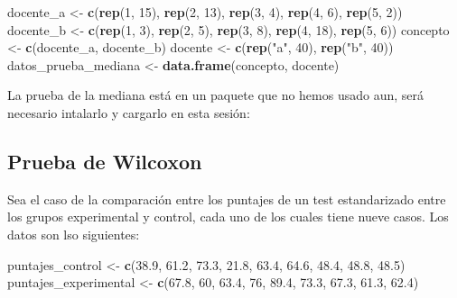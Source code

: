 \documentclass[]{book}
\newenvironment{Shaded}{\begin{snugshade}}{\end{snugshade}}
\newcommand{\DecValTok}[1]{\textcolor[rgb]{0.00,0.00,0.81}{#1}}
\newcommand{\FloatTok}[1]{\textcolor[rgb]{0.00,0.00,0.81}{#1}}
\newcommand{\KeywordTok}[1]{\textcolor[rgb]{0.13,0.29,0.53}{\textbf{#1}}}
\newcommand{\NormalTok}[1]{#1}
\newcommand{\StringTok}[1]{\textcolor[rgb]{0.31,0.60,0.02}{#1}}
\begin{document}
\begin{Shaded}
\begin{Highlighting}[]
\NormalTok{docente_a <-}\StringTok{ }\KeywordTok{c}\NormalTok{(}\KeywordTok{rep}\NormalTok{(}\DecValTok{1}\NormalTok{, }\DecValTok{15}\NormalTok{), }\KeywordTok{rep}\NormalTok{(}\DecValTok{2}\NormalTok{, }\DecValTok{13}\NormalTok{), }\KeywordTok{rep}\NormalTok{(}\DecValTok{3}\NormalTok{, }\DecValTok{4}\NormalTok{), }\KeywordTok{rep}\NormalTok{(}\DecValTok{4}\NormalTok{, }\DecValTok{6}\NormalTok{), }\KeywordTok{rep}\NormalTok{(}\DecValTok{5}\NormalTok{, }\DecValTok{2}\NormalTok{))}
\NormalTok{docente_b <-}\StringTok{ }\KeywordTok{c}\NormalTok{(}\KeywordTok{rep}\NormalTok{(}\DecValTok{1}\NormalTok{, }\DecValTok{3}\NormalTok{), }\KeywordTok{rep}\NormalTok{(}\DecValTok{2}\NormalTok{, }\DecValTok{5}\NormalTok{), }\KeywordTok{rep}\NormalTok{(}\DecValTok{3}\NormalTok{, }\DecValTok{8}\NormalTok{), }\KeywordTok{rep}\NormalTok{(}\DecValTok{4}\NormalTok{, }\DecValTok{18}\NormalTok{), }\KeywordTok{rep}\NormalTok{(}\DecValTok{5}\NormalTok{, }\DecValTok{6}\NormalTok{))}
\NormalTok{concepto <-}\StringTok{ }\KeywordTok{c}\NormalTok{(docente_a, docente_b)}
\NormalTok{docente <-}\StringTok{ }\KeywordTok{c}\NormalTok{(}\KeywordTok{rep}\NormalTok{(}\StringTok{"a"}\NormalTok{, }\DecValTok{40}\NormalTok{), }\KeywordTok{rep}\NormalTok{(}\StringTok{"b"}\NormalTok{, }\DecValTok{40}\NormalTok{))}
\NormalTok{datos_prueba_mediana <-}\StringTok{ }\KeywordTok{data.frame}\NormalTok{(concepto, docente)}
\end{Highlighting}
\end{Shaded}

La prueba de la mediana está en un paquete que no hemos usado aun, será necesario intalarlo y cargarlo en esta sesión:

\hypertarget{prueba-de-wilcoxon}{%
\subsection{Prueba de Wilcoxon}\label{prueba-de-wilcoxon}}

Sea el caso de la comparación entre los puntajes de un test estandarizado entre los grupos experimental y control, cada uno de los cuales tiene nueve casos. Los datos son lso siguientes:

\begin{Shaded}
\begin{Highlighting}[]
\NormalTok{puntajes_control <-}\StringTok{ }\KeywordTok{c}\NormalTok{(}\FloatTok{38.9}\NormalTok{, }\FloatTok{61.2}\NormalTok{, }\FloatTok{73.3}\NormalTok{, }\FloatTok{21.8}\NormalTok{, }\FloatTok{63.4}\NormalTok{, }\FloatTok{64.6}\NormalTok{, }\FloatTok{48.4}\NormalTok{, }\FloatTok{48.8}\NormalTok{, }\FloatTok{48.5}\NormalTok{)}
\NormalTok{puntajes_experimental <-}\StringTok{ }\KeywordTok{c}\NormalTok{(}\FloatTok{67.8}\NormalTok{, }\DecValTok{60}\NormalTok{, }\FloatTok{63.4}\NormalTok{, }\DecValTok{76}\NormalTok{, }\FloatTok{89.4}\NormalTok{, }\FloatTok{73.3}\NormalTok{, }\FloatTok{67.3}\NormalTok{, }\FloatTok{61.3}\NormalTok{, }\FloatTok{62.4}\NormalTok{)}
\end{Highlighting}
\end{Shaded}
\end{document}
